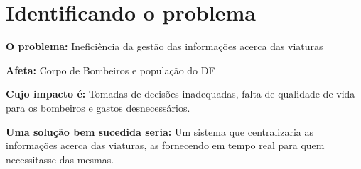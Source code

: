 \chapter{Identificando o problema}

  \textbf{O problema:} Ineficiência da gestão das informações acerca das viaturas
  
  \textbf{Afeta:} Corpo de Bombeiros e população do DF
  
  \textbf{Cujo impacto é:} Tomadas de decisões inadequadas, falta de qualidade de vida para os bombeiros e gastos desnecessários.
  
  \textbf{Uma solução bem sucedida seria:} Um sistema que centralizaria as informações acerca das viaturas, as fornecendo em tempo real para quem necessitasse das mesmas.